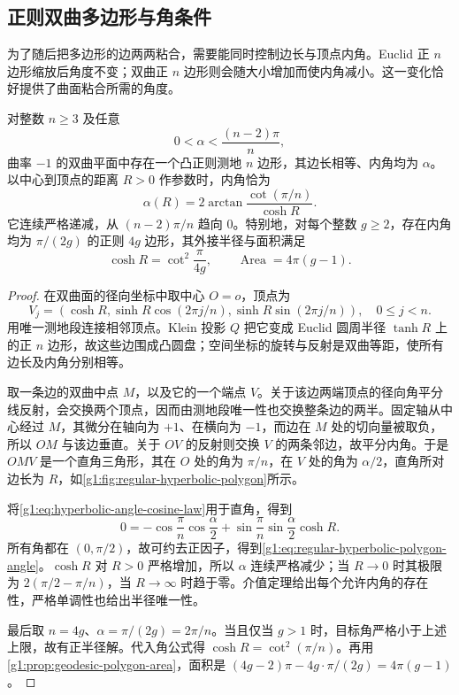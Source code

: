 \subsection{正则双曲多边形与角条件}
\label{g1:subsec:1001:07}

为了随后把多边形的边两两粘合，需要能同时控制边长与顶点内角。Euclid 正 \(n\) 边形缩放后角度不变；双曲正 \(n\) 边形则会随大小增加而使内角减小。这一变化恰好提供了曲面粘合所需的角度。

\begin{proposition}
	\label{g1:prop:regular-hyperbolic-polygons}
	对整数 \(n\geq3\) 及任意
	\[
		0<\alpha<\frac{(n-2)\pi}{n},
	\]
	曲率 \(-1\) 的双曲平面中存在一个凸正则测地 \(n\) 边形，其边长相等、内角均为 \(\alpha\)。以中心到顶点的距离 \(R>0\) 作参数时，内角恰为
	\begin{equation}
		\label{g1:eq:regular-hyperbolic-polygon-angle}
		\alpha(R)=2\arctan\frac{\cot(\pi/n)}{\cosh R}.
	\end{equation}
	它连续严格递减，从 \((n-2)\pi/n\) 趋向 \(0\)。特别地，对每个整数 \(g\geq2\)，存在内角均为 \(\pi/(2g)\) 的正则 \(4g\) 边形，其外接半径与面积满足
	\[
		\cosh R=\cot^2\frac{\pi}{4g},\qquad
		\operatorname{Area}=4\pi(g-1).
	\]
\end{proposition}
\begin{proof}
	在双曲面的径向坐标中取中心 \(O=o\)，顶点为
	\[
		V_j=(\cosh R,\sinh R\cos(2\pi j/n),\sinh R\sin(2\pi j/n)),
		\quad 0\leq j<n.
	\]
	用唯一测地段连接相邻顶点。Klein 投影 \(Q\) 把它变成 Euclid 圆周半径 \(\tanh R\) 上的正 \(n\) 边形，故这些边围成凸圆盘；空间坐标的旋转与反射是双曲等距，使所有边长及内角分别相等。

	取一条边的双曲中点 \(M\)，以及它的一个端点 \(V\)。关于该边两端顶点的径向角平分线反射，会交换两个顶点，因而由测地段唯一性也交换整条边的两半。固定轴从中心经过 \(M\)，其微分在轴向为 \(+1\)、在横向为 \(-1\)，而边在 \(M\) 处的切向量被取负，所以 \(OM\) 与该边垂直。关于 \(OV\) 的反射则交换 \(V\) 的两条邻边，故平分内角。于是 \(OMV\) 是一个直角三角形，其在 \(O\) 处的角为 \(\pi/n\)，在 \(V\) 处的角为 \(\alpha/2\)，直角所对边长为 \(R\)，如\cref{g1:fig:regular-hyperbolic-polygon}所示。

	将\eqref{g1:eq:hyperbolic-angle-cosine-law}用于直角，得到
	\[
		0=-\cos\frac\pi n\cos\frac\alpha2
		+\sin\frac\pi n\sin\frac\alpha2\cosh R.
	\]
	所有角都在 \((0,\pi/2)\)，故可约去正因子，得到\eqref{g1:eq:regular-hyperbolic-polygon-angle}。\(\cosh R\) 对 \(R>0\) 严格增加，所以 \(\alpha\) 连续严格减少；当 \(R\to0\) 时其极限为 \(2(\pi/2-\pi/n)\)，当 \(R\to\infty\) 时趋于零。介值定理给出每个允许内角的存在性，严格单调性也给出半径唯一性。

	最后取 \(n=4g\)、\(\alpha=\pi/(2g)=2\pi/n\)。当且仅当 \(g>1\) 时，目标角严格小于上述上限，故有正半径解。代入角公式得 \(\cosh R=\cot^2(\pi/n)\)。再用\cref{g1:prop:geodesic-polygon-area}，面积是 \((4g-2)\pi-4g\cdot\pi/(2g)=4\pi(g-1)\)。
\end{proof}

